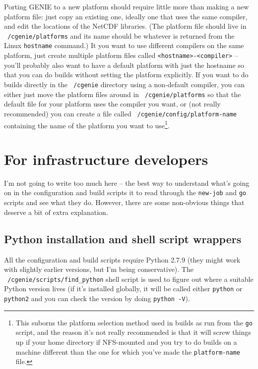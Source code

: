 \documentclass[a4paper,10pt,article]{memoir}
\begin{document}
Porting GENIE to a new platform should require little more than making
a new platform file: just copy an existing one, ideally one that uses
the same compiler, and edit the locations of the NetCDF libraries.
(The platform file should live in \texttt{~/cgenie/platforms} and its
name should be whatever is returned from the Linux \texttt{hostname}
command.)  It you want to use different compilers on the same
platform, just create multiple platform files called
\texttt{<hostname>-<compiler>} -- you'll probably also want to have a
default platform with just the hostname so that you can do builds
without setting the platform explicitly.  If you want to do builds
directly in the \texttt{~/cgenie} directory using a non-default
compiler, you can either just move the platform files around in
\texttt{~/cgenie/platforms} so that the default file for your platform
uses the compiler you want, or (not really recommended) you can create
a file called \texttt{~/cgenie/config/platform-name} containing the
name of the platform you want to use\footnote{This suborns the
  platform selection method used in builds as run from the \texttt{go}
  script, and the reason it's not really recommended is that it will
  screw things up if your home directory if NFS-mounted and you try to
  do builds on a machine different than the one for which you've made
  the \texttt{platform-name} file.}.


\chapter{For infrastructure developers}

I'm not going to write too much here -- the best way to understand
what's going on in the configuration and build scripts it to read
through the \texttt{new-job} and \texttt{go} scripts and see what they
do.  However, there are some non-obvious things that deserve a bit of
extra explanation.

\section{Python installation and shell script wrappers}

All the configuration and build scripts require Python 2.7.9 (they
might work with slightly earlier versions, but I'm being
conservative).  The \texttt{~/cgenie/scripts/find\_python} shell
script is used to figure out where a suitable Python version lives (if
it's installed globally, it will be called either \texttt{python} or
\texttt{python2} and you can check the version by doing \texttt{python
  -V}).
\end{document}

